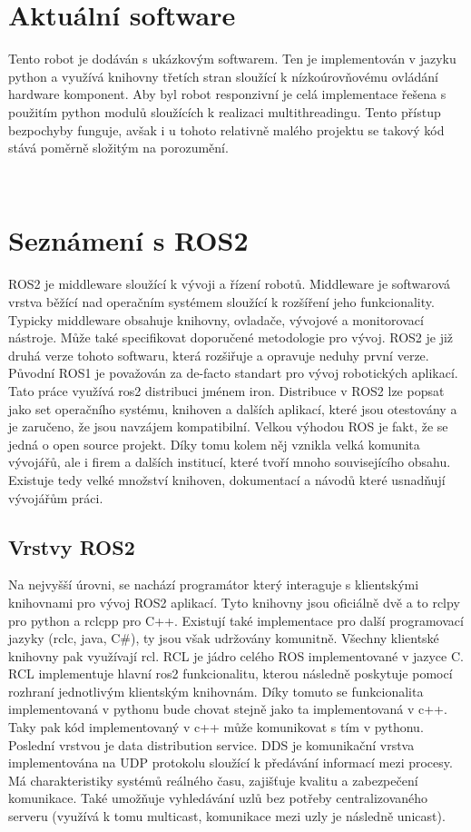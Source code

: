 \section{Aktuální software}
Tento robot je dodáván s ukázkovým softwarem. Ten je implementován v jazyku python a využívá knihovny třetích stran sloužící k nízkoúrovňovému ovládání hardware komponent. Aby byl robot responzivní je celá implementace řešena s použitím python modulů sloužících k realizaci multithreadingu. Tento přístup bezpochyby funguje, avšak i u tohoto relativně malého projektu se takový kód stává poměrně složitým na porozumění.


\



\section{Seznámení s ROS2} %
ROS2 je middleware sloužící k vývoji a řízení robotů. Middleware je softwarová vrstva běžící nad operačním systémem sloužící k rozšíření jeho funkcionality. Typicky middleware obsahuje knihovny, ovladače, vývojové a monitorovací nástroje. Může také specifikovat doporučené metodologie pro vývoj. ROS2 je již druhá verze tohoto softwaru, která rozšiřuje a opravuje neduhy první verze. Původní ROS1 je považován za de-facto standart pro vývoj robotických aplikací.
Tato práce využívá ros2 distribuci jménem iron. Distribuce v ROS2 lze popsat jako set operačního systému, knihoven a dalších aplikací, které jsou otestovány a je zaručeno, že jsou navzájem kompatibilní. Velkou výhodou ROS je fakt, že se jedná o open source projekt. Díky tomu kolem něj vznikla velká komunita vývojářů, ale i firem a dalších institucí, které tvoří mnoho souvisejícího obsahu. Existuje tedy velké množství knihoven, dokumentací a návodů které usnadňují vývojářům práci.

\subsection*{Vrstvy ROS2}
Na nejvyšší úrovni, se nachází programátor který interaguje s klientskými knihovnami pro vývoj ROS2 aplikací. Tyto knihovny jsou oficiálně dvě a to rclpy pro python a rclcpp pro C++. Existují také implementace pro další programovací jazyky (rclc, java, C\#), ty jsou však udržovány komunitně. Všechny klientské knihovny pak využívají rcl. RCL je jádro celého ROS implementované v jazyce C. RCL implementuje hlavní ros2 funkcionalitu, kterou následně poskytuje pomocí rozhraní jednotlivým klientským knihovnám. Díky tomuto se funkcionalita implementovaná v pythonu bude chovat stejně jako ta implementovaná v c++. Taky pak kód implementovaný v c++ může komunikovat s tím v pythonu.
Poslední vrstvou je data distribution service. DDS je komunikační vrstva implementována na UDP protokolu sloužící k předávání informací mezi procesy. Má charakteristiky systémů reálného času, zajišťuje kvalitu a zabezpečení komunikace. Také umožňuje vyhledávání uzlů bez potřeby centralizovaného serveru (využívá k tomu multicast, komunikace mezi uzly je následně unicast).

